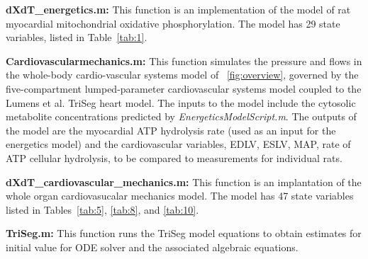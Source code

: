 \documentclass[fleqn,10pt]{physiome}
\begin{document}
\textbf{dXdT\_energetics.m:} This function is an implementation of the \cite{Bazil2016} model of rat myocardial mitochondrial oxidative phosphorylation. The model has 29 state variables, listed in Table~\ref{tab:1}.

\textbf{Cardiovascularmechanics.m:} This function simulates the pressure and flows in the whole-body cardio-vascular systems model of ~\ref{fig:overview}, governed by the five-compartment lumped-parameter cardiovascular systems model coupled to the Lumens et al. TriSeg heart model. The inputs to the model include the cytosolic metabolite concentrations predicted by {\em EnergeticsModelScript.m}. The outputs of the model are the myocardial ATP hydrolysis rate (used as an input for the energetics model) and the cardiovascular variables, EDLV, ESLV, MAP, rate of ATP cellular hydrolysis, to be compared to measurements for individual rats.

\textbf{dXdT\_cardiovascular\_mechanics.m:} This function is an implantation of the whole organ cardiovasucalar mechanics model. The model has 47 state variables listed in Tables~\ref{tab:5}, \ref{tab:8}, and \ref{tab:10}.

\textbf{TriSeg.m:} This function runs the TriSeg model equations to obtain estimates for initial value for ODE solver and the associated algebraic equations.


\end{document}
